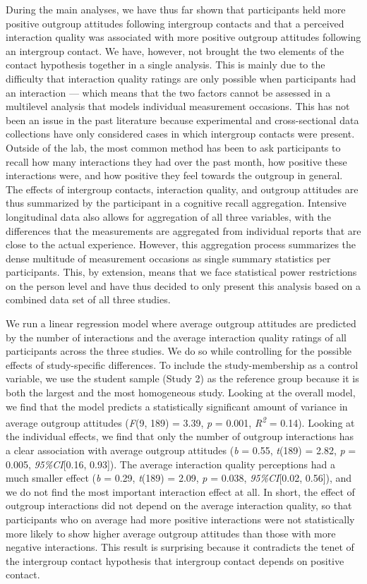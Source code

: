 During the main analyses, we have thus far shown that participants held
more positive outgroup attitudes following intergroup contacts and that
a perceived interaction quality was associated with more positive
outgroup attitudes following an intergroup contact. We have, however,
not brought the two elements of the contact hypothesis together in a
single analysis. This is mainly due to the difficulty that interaction
quality ratings are only possible when participants had an interaction
--- which means that the two factors cannot be assessed in a multilevel
analysis that models individual measurement occasions. This has not been
an issue in the past literature because experimental and cross-sectional
data collections have only considered cases in which intergroup contacts
were present. Outside of the lab, the most common method has been to ask
participants to recall how many interactions they had over the past
month, how positive these interactions were, and how positive they feel
towards the outgroup in general. The effects of intergroup contacts,
interaction quality, and outgroup attitudes are thus summarized by the
participant in a cognitive recall aggregation. Intensive longitudinal
data also allows for aggregation of all three variables, with the
differences that the measurements are aggregated from individual reports
that are close to the actual experience. However, this aggregation
process summarizes the dense multitude of measurement occasions as
single summary statistics per participants. This, by extension, means
that we face statistical power restrictions on the person level and have
thus decided to only present this analysis based on a combined data set
of all three studies.

We run a linear regression model where average outgroup attitudes are
predicted by the number of interactions and the average interaction
quality ratings of all participants across the three studies. We do so
while controlling for the possible effects of study-specific
differences. To include the study-membership as a control variable, we
use the student sample (Study 2) as the reference group because it is
both the largest and the most homogeneous study. Looking at the overall
model, we find that the model predicts a statistically significant
amount of variance in average outgroup attitudes (\textit{F}(9, 189) =
3.39, \textit{p} = 0.001, \textit{R\textsuperscript{2}} = 0.14). Looking
at the individual effects, we find that only the number of outgroup
interactions has a clear association with average outgroup attitudes
(\textit{b} = 0.55, \textit{t}(189) = 2.82, \textit{p} = 0.005,
\textit{95\%CI}{[}0.16, 0.93{]}). The average interaction quality
perceptions had a much smaller effect (\textit{b} = 0.29,
\textit{t}(189) = 2.09, \textit{p} = 0.038, \textit{95\%CI}{[}0.02,
0.56{]}), and we do not find the most important interaction effect at
all. In short, the effect of outgroup interactions did not depend on the
average interaction quality, so that participants who on average had
more positive interactions were not statistically more likely to show
higher average outgroup attitudes than those with more negative
interactions. This result is surprising because it contradicts the tenet
of the intergroup contact hypothesis that intergroup contact depends on
positive contact.

